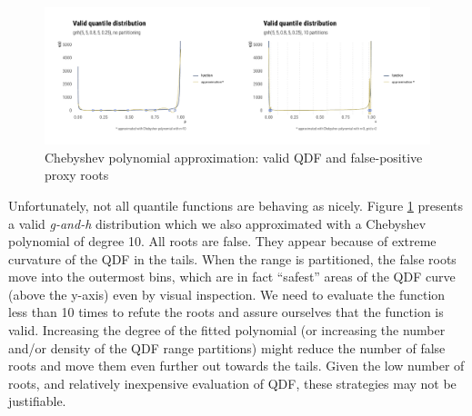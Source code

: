 \documentclass[
  12pt,
]{article}
\begin{document}
\begin{figure}

{\centering \includegraphics{ilbm_article_files/figure-latex/chebyshev-roots-gnh-graph-1} 

}

\caption{Chebyshev polynomial approximation: valid QDF and false-positive proxy roots}\label{fig:chebyshev-roots-gnh-graph}
\end{figure}

Unfortunately, not all quantile functions are behaving as nicely. Figure \ref{fig:chebyshev-roots-gnh-graph} presents a valid \emph{g-and-h} distribution which we also approximated with a Chebyshev polynomial of degree 10. All roots are false. They appear because of extreme curvature of the QDF in the tails. When the range is partitioned, the false roots move into the outermost bins, which are in fact ``safest'' areas of the QDF curve (above the y-axis) even by visual inspection. We need to evaluate the function less than 10 times to refute the roots and assure ourselves that the function is valid. Increasing the degree of the fitted polynomial (or increasing the number and/or density of the QDF range partitions) might reduce the number of false roots and move them even further out towards the tails. Given the low number of roots, and relatively inexpensive evaluation of QDF, these strategies may not be justifiable.

  
\end{document}
